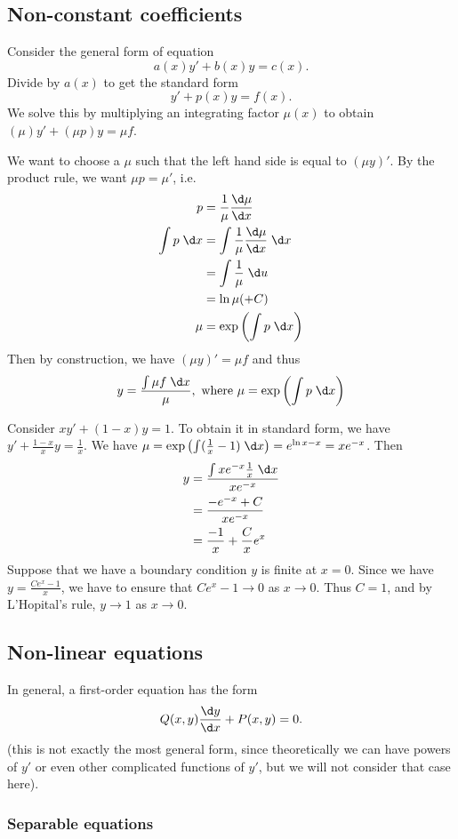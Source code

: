 \documentclass[a4paper]{article}
\begin{document}
\subsection{Non-constant coefficients}
Consider the general form of equation
\[
  a(x)y' + b(x)y = c(x).
\]
Divide by $a(x)$ to get the standard form
\[
  y' + p(x) y = f(x).
\]
We solve this by multiplying an integrating factor $\mu (x)$ to obtain $(\mu)y' + (\mu p)y = \mu f$.

We want to choose a $\mu$ such that the left hand side is equal to $(\mu y)'$. By the product rule, we want $\mu p = \mu'$, i.e.
\begin{align*}
  p &= \frac{1}{\mu}\frac{\d\mu }{\d x}\\
  \int p\; \d x &= \int \frac{1}{\mu}\frac{\d \mu}{\d x} \; \d x\\
  &= \int \frac{1}{\mu}\; \d u\\
  &= \ln \mu (+ C)\\
  \mu &= \exp\left(\int p\; \d x\right)
\end{align*}
Then by construction, we have $(\mu y)' = \mu f$ and thus
\[
  y = \frac{\int \mu f\;\d x}{\mu},\text{ where } \mu = \exp\left(\int p\; \d x\right)
\]
\begin{eg}
  Consider $xy' + (1 - x)y = 1$. To obtain it in standard form, we have $y' + \frac{1 - x}{x} y = \frac{1}{x}$.
  We have $\mu = \exp\left(\int (\frac{1}{x} - 1)\; \d x\right) = e^{\ln x - x} = xe^{-x}$. Then
  \begin{align*}
    y &= \frac{\int xe^{-x}\frac{1}{x}\;\d x}{xe^{-x}}\\
    &= \frac{-e^{-x} + C}{xe^{-x}}\\
    &= \frac{-1}{x} + \frac{C}{x}e^x
  \end{align*}
  Suppose that we have a boundary condition $y$ is finite at $x = 0$. Since we have $y = \frac{Ce^x - 1}{x}$, we have to ensure that $Ce^x - 1\to 0$ as $x\to 0$. Thus $C = 1$, and by L'Hopital's rule, $y\to 1$ as $x\to 0$.
\end{eg}

\subsection{Non-linear equations}
In general, a first-order equation has the form
\[
  Q(x, y)\frac{\d y}{\d x} + P(x, y) = 0.
\]
(this is not exactly the most general form, since theoretically we can have powers of $y'$ or even other complicated functions of $y'$, but we will not consider that case here).
\subsubsection{Separable equations}
\end{document}
